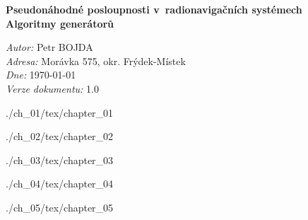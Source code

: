 \documentclass[twoside,11pt]{article}
\begin{document}
\begin{titlepage}



\center %






{ \huge \bfseries Pseudonáhodné posloupnosti v~radionavigačních systémech}\\[2in] %
\fontsize{17}{12}\textbf{\textcolor{bgr_DarkBlue}{Algoritmy generátorů}}\\[4in]
        
\begin{minipage}{0.9\textwidth}
\begin{flushleft} \large
\emph{Autor:} Petr \textsc{BOJDA}\\

\emph{Adresa:} Morávka 575, okr. Frýdek-Místek\\
\emph{Dne:} \today\\
\emph{Verze dokumentu:} 1.0
\end{flushleft}
\end{minipage}


\end{titlepage}

 {./ch_01/tex/chapter_01}

 {./ch_02/tex/chapter_02}

 {./ch_03/tex/chapter_03}

 {./ch_04/tex/chapter_04}


 {./ch_05/tex/chapter_05}



\end{document}
